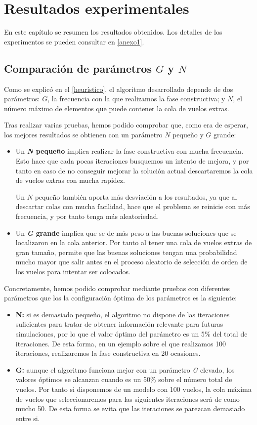 \chapter{Resultados experimentales}
\label{resultados}

En este capítulo se resumen los resultados obtenidos. Los detalles de los experimentos se pueden consultar en \autoref{anexo1}.

\section{Comparación de parámetros $G$ y $N$}
Como se explicó en el \autoref{heurístico}, el algoritmo desarrollado depende de dos parámetros: $G$, la frecuencia con la que realizamos la fase constructiva; y $N$, el número máximo de elementos que puede contener la cola de vuelos extras.

Tras realizar varias pruebas, hemos podido comprobar que, como era de esperar, los mejores resultados se obtienen con un parámetro $N$ pequeño y $G$ grande:
\begin{itemize}
	\item Un \textbf{\textit{N} pequeño} implica realizar la fase constructiva con mucha frecuencia. Esto hace que cada pocas iteraciones busquemos un intento de mejora, y por tanto en caso de no conseguir mejorar la solución actual descartaremos la cola de vuelos extras con mucha rapidez.
	
	Un $N$ pequeño también aporta más desviación a los resultados, ya que al descartar colas con mucha facilidad, hace que el problema se reinicie con más frecuencia, y por tanto tenga más aleatoriedad. 
	
	\item Un \textbf{\textit{G} grande} implica que se de más peso a las buenas soluciones que se localizaron en la cola anterior. Por tanto al tener una cola de vuelos extras de gran tamaño, permite que las buenas soluciones tengan una probabilidad mucho mayor que salir antes en el proceso aleatorio de selección de orden de los vuelos para intentar ser colocados.
\end{itemize} 

Concretamente, hemos podido comprobar mediante pruebas con diferentes parámetros que los la configuración óptima de los parámetros es la siguiente:
\begin{itemize}
	\item \textbf{N:} si es demasiado pequeño, el algoritmo no dispone de las iteraciones suficientes para tratar de obtener información relevante para futuras simulaciones, por lo que el valor óptimo del parámetro es un 5\% del total de iteraciones. De esta forma, en un ejemplo sobre el que realizamos 100 iteraciones, realizaremos la fase constructiva en 20 ocasiones. 
	\item \textbf{G:} aunque el algoritmo funciona mejor con un parámetro \textit{G} elevado, los valores óptimos se alcanzan cuando es un 50\% sobre el número total de vuelos. Por tanto si disponemos de un modelo con 100 vuelos, la cola máxima de vuelos que seleccionaremos para las siguientes iteraciones será de como mucho 50. De esta forma se evita que las iteraciones se parezcan demasiado entre si.
\end{itemize}


